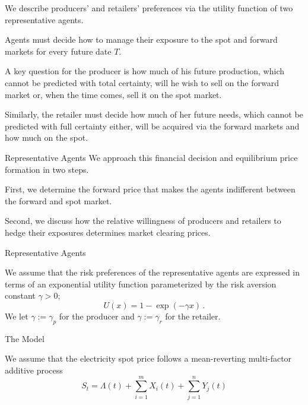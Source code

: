 


	We describe producers' and retailers'
preferences via the utility function of two representative agents.

	Agents
must decide how to manage their exposure to the spot and forward
markets for every future date $T$.

A key question for the producer
is how much of his future production, which cannot be predicted with
total certainty, will he wish to sell on the forward market or, when
the time comes, sell it on the spot market.

	Similarly, the retailer
must decide how much of her future needs, which cannot be predicted
with full certainty either, will be acquired via the forward markets
and how much on the spot.






{Representative Agents}
We approach this financial decision and
equilibrium price formation in two steps.






	First, we determine the
forward price that makes the agents indifferent between the forward
and spot market.

	Second, we discuss how the relative willingness
of producers and retailers to hedge their exposures determines
market clearing prices.






{Representative Agents}

We assume that the risk preferences of the representative agents are
expressed in terms of an exponential utility function parameterized
by the risk aversion constant $\gamma>0$;
$$
U(x)=1-\exp(-\gamma x)\,.
$$
We let $\gamma:=\gamma_p$ for the producer and $\gamma:=\gamma_r$
for the retailer.

{The Model}






We assume that the electricity spot price follows a
mean-reverting multi-factor additive process
\begin{equation}\label{equation for additive stock price}
S_t=\Lambda(t)+\sum_{i=1}^mX_i(t)+\sum_{j=1}^nY_j(t)
\end{equation}

